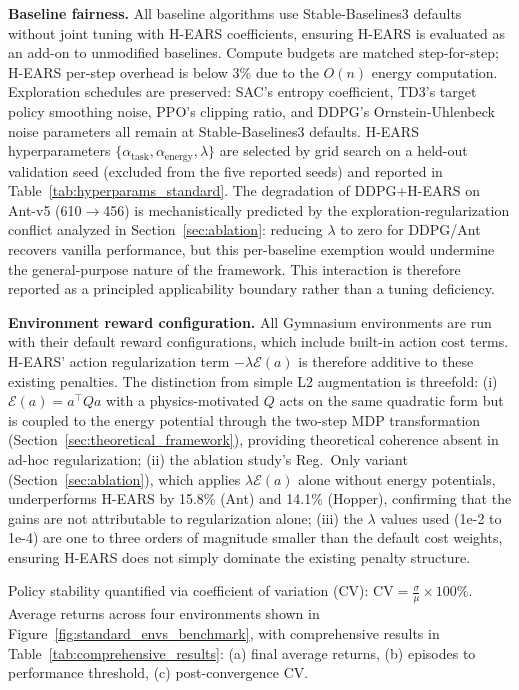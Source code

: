 \documentclass[journal]{IEEEtran}
\begin{document}
	\textbf{Baseline fairness.} All baseline algorithms use Stable-Baselines3 defaults without joint tuning with H-EARS coefficients, ensuring H-EARS is evaluated as an add-on to unmodified baselines. Compute budgets are matched step-for-step; H-EARS per-step overhead is below 3\% due to the $O(n)$ energy computation. Exploration schedules are preserved: SAC's entropy coefficient, TD3's target policy smoothing noise, PPO's clipping ratio, and DDPG's Ornstein-Uhlenbeck noise parameters all remain at Stable-Baselines3 defaults. H-EARS hyperparameters $\{\alpha_{\text{task}}, \alpha_{\text{energy}}, \lambda\}$ are selected by grid search on a held-out validation seed (excluded from the five reported seeds) and reported in Table~\ref{tab:hyperparams_standard}. The degradation of DDPG+H-EARS on Ant-v5 (610$\to$456) is mechanistically predicted by the exploration-regularization conflict analyzed in Section~\ref{sec:ablation}: reducing $\lambda$ to zero for DDPG/Ant recovers vanilla performance, but this per-baseline exemption would undermine the general-purpose nature of the framework. This interaction is therefore reported as a principled applicability boundary rather than a tuning deficiency. 
	
	\textbf{Environment reward configuration.} All Gymnasium environments are run with their default reward configurations, which include built-in action cost terms. H-EARS' action regularization term $-\lambda\mathcal{E}(a)$ is therefore additive to these existing penalties. The distinction from simple L2 augmentation is threefold: (i) $\mathcal{E}(a)=a^\top Qa$ with a physics-motivated $Q$ acts on the same quadratic form but is coupled to the energy potential through the two-step MDP transformation (Section~\ref{sec:theoretical_framework}), providing theoretical coherence absent in ad-hoc regularization; (ii) the ablation study's Reg.~Only variant (Section~\ref{sec:ablation}), which applies $\lambda\mathcal{E}(a)$ alone without energy potentials, underperforms H-EARS by 15.8\% (Ant) and 14.1\% (Hopper), confirming that the gains are not attributable to regularization alone; (iii) the $\lambda$ values used (1e-2 to 1e-4) are one to three orders of magnitude smaller than the default cost weights, ensuring H-EARS does not simply dominate the existing penalty structure.
	
	Policy stability quantified via coefficient of variation (CV): $\text{CV} = \frac{\sigma}{\mu} \times 100\%$. Average returns across four environments shown in Figure~\ref{fig:standard_envs_benchmark}, with comprehensive results in Table~\ref{tab:comprehensive_results}: (a) final average returns, (b) episodes to performance threshold, (c) post-convergence CV.
	
\end{document}
